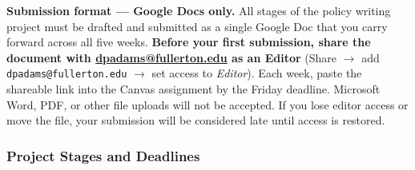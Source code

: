 \documentclass[12pt]{article}
\begin{document}
\vspace{0.5em}
\noindent \textbf{Submission format --- Google Docs only.} All stages of the policy writing project must be drafted and submitted as a single Google Doc that you carry forward across all five weeks. \textbf{Before your first submission, share the document with \href{mailto:dpadams@fullerton.edu}{dpadams@fullerton.edu} as an Editor} (Share $\rightarrow$ add \texttt{dpadams@fullerton.edu} $\rightarrow$ set access to \emph{Editor}). Each week, paste the shareable link into the Canvas assignment by the Friday deadline. Microsoft Word, PDF, or other file uploads will not be accepted. If you lose editor access or move the file, your submission will be considered late until access is restored.

\subsubsection*{Project Stages and Deadlines}
\end{document}
